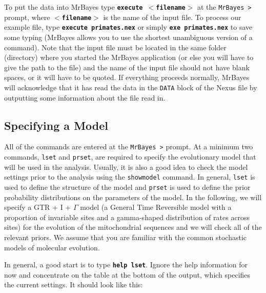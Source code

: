 \documentclass[12pt]{book}
\newcommand{\ttt}[1]{\texttt{#1}}
\newcommand{\tb}[1]{\ttt{\textbf{#1}}}
\begin{document}
To put the data into MrBayes type \tb{execute $<$filename$>$} at the \ttt{MrBayes >} prompt, where
\tb{$<$filename$>$} is the name of the input file. To process our example file, type \tb{execute
primates.nex} or simply \tb{exe primates.nex} to save some typing (MrBayes allows you to use the
shortest unambiguous version of a command). Note that the input file must be located in the same
folder (directory) where you started the MrBayes application (or else you will have to give the
path to the file) and the name of the input file should not have blank spaces, or it will have to
be quoted. If everything proceeds normally, MrBayes will acknowledge that it has read the data in
the \ttt{DATA} block of the Nexus file by outputting some information about the file read in.

\subsection{Specifying a Model}

All of the commands are entered at the \ttt{MrBayes >} prompt. At a minimum two commands,
\ttt{lset} and \ttt{prset}, are required to specify the evolutionary model that will be used in the
analysis. Usually, it is also a good idea to check the model settings prior to the analysis using
the \ttt{showmodel} command. In general, \ttt{lset} is used to define the structure of the model
and \ttt{prset} is used to define the prior probability distributions on the parameters of the
model. In the following, we will specify a GTR + I + $\Gamma$ model (a General Time Reversible model
with a proportion of invariable sites and a gamma-shaped distribution of rates across sites) for
the evolution of the mitochondrial sequences and we will check all of the relevant priors. We
assume that you are familiar with the common stochastic models of molecular evolution.

In general, a good start is to type \tb{help lset}. Ignore the help information for now and
concentrate on the table at the bottom of the output, which specifies the current settings. It
should look like this:
\end{document}
